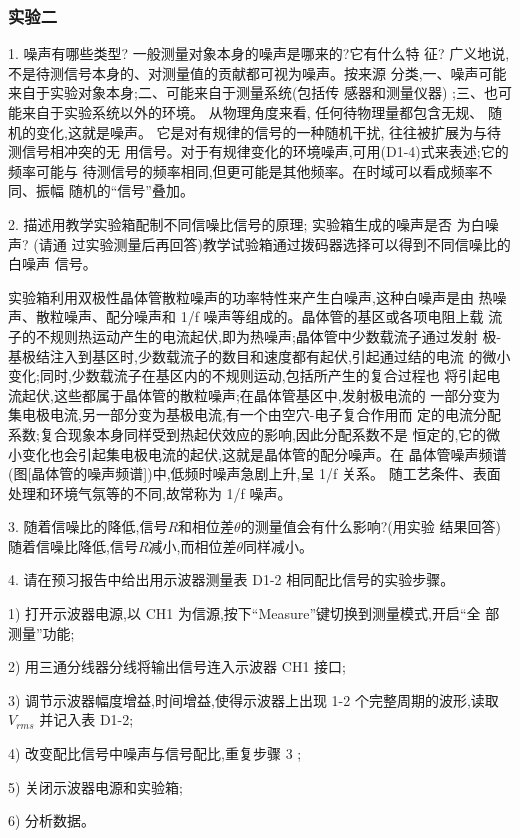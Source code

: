 \documentclass[11pt,a4paper]{ctexart}
\begin{document}
\subsubsection{实验二}
1. 噪声有哪些类型? 一般测量对象本身的噪声是哪来的?它有什么特
征?
广义地说,不是待测信号本身的、对测量值的贡献都可视为噪声。按来源
分类,一、噪声可能来自于实验对象本身;二、可能来自于测量系统(包括传
感器和测量仪器)
;三、也可能来自于实验系统以外的环境。
从物理角度来看, 任何待物理量都包含无规、 随机的变化,这就是噪声。
它是对有规律的信号的一种随机干扰, 往往被扩展为与待测信号相冲突的无
用信号。对于有规律变化的环境噪声,可用(D1-4)式来表述;它的频率可能与
待测信号的频率相同,但更可能是其他频率。在时域可以看成频率不同、振幅
随机的“信号”叠加。

2. 描述用教学实验箱配制不同信噪比信号的原理; 实验箱生成的噪声是否
为白噪声? (请通
过实验测量后再回答)教学试验箱通过拨码器选择可以得到不同信噪比的白噪声
信号。

实验箱利用双极性晶体管散粒噪声的功率特性来产生白噪声,这种白噪声是由
热噪声、散粒噪声、配分噪声和 1/f 噪声等组成的。晶体管的基区或各项电阻上载
流子的不规则热运动产生的电流起伏,即为热噪声;晶体管中少数载流子通过发射
极-基极结注入到基区时,少数载流子的数目和速度都有起伏,引起通过结的电流
的微小变化;同时,少数载流子在基区内的不规则运动,包括所产生的复合过程也
将引起电流起伏,这些都属于晶体管的散粒噪声;在晶体管基区中,发射极电流的
一部分变为集电极电流,另一部分变为基极电流,有一个由空穴-电子复合作用而
定的电流分配系数;复合现象本身同样受到热起伏效应的影响,因此分配系数不是
恒定的,它的微小变化也会引起集电极电流的起伏,这就是晶体管的配分噪声。在
晶体管噪声频谱(图[晶体管的噪声频谱])中,低频时噪声急剧上升,呈 1/f 关系。
随工艺条件、表面处理和环境气氛等的不同,故常称为 1/f 噪声。

3. 随着信噪比的降低,信号$R$和相位差$\theta$的测量值会有什么影响?(用实验
结果回答)
随着信噪比降低,信号$R$减小,而相位差$\theta$同样减小。

4. 请在预习报告中给出用示波器测量表 D1-2 相同配比信号的实验步骤。

1) 打开示波器电源,以 CH1 为信源,按下“Measure”键切换到测量模式,开启“全
部测量”功能;

2) 用三通分线器分线将输出信号连入示波器 CH1 接口;

3) 调节示波器幅度增益,时间增益,使得示波器上出现 1-2 个完整周期的波形,读取
$V_{rms}$ 并记入表 D1-2;

4) 改变配比信号中噪声与信号配比,重复步骤 3 ;

5) 关闭示波器电源和实验箱;

6) 分析数据。
\end{document}
